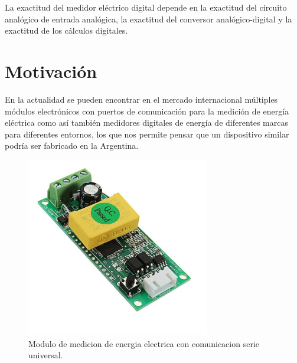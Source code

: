 La exactitud del medidor eléctrico digital depende en la exactitud del circuito analógico de entrada analógica, la exactitud del conversor analógico-digital y la exactitud de los cálculos digitales.\citep{Hribik2004DigitalPA}

\section{Motivación}

En la actualidad se pueden encontrar en el mercado internacional múltiples módulos electrónicos con puertos de comunicación para la medición de energía eléctrica como así también medidores digitales de energía de diferentes marcas para diferentes entornos, los que nos permite pensar que un dispositivo similar podría ser fabricado en la Argentina.

\begin{figure}[h]
	\centering
	\includegraphics[width=80mm,keepaspectratio]{Figures/pzeem004.jpg}
	\caption{Modulo de medicion de energia electrica con comunicacion serie universal.}
	\label{fig:texmaker}
\end{figure}







